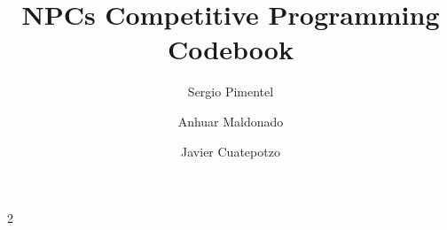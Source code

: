 \documentclass[10pt,a4paper,landscape]{article}
\title{NPCs Competitive Programming Codebook}
\author{Sergio Pimentel \and Anhuar Maldonado \and Javier Cuatepotzo}
\date{}
\begin{document}
\maketitle
\vspace{-1.5em}
\tableofcontents
\clearpage

\ifdefined\CodebookLandscape
  \begin{multicols}{2}
\fi








\ifdefined\CodebookLandscape
  \end{multicols}
\fi
\end{document}
